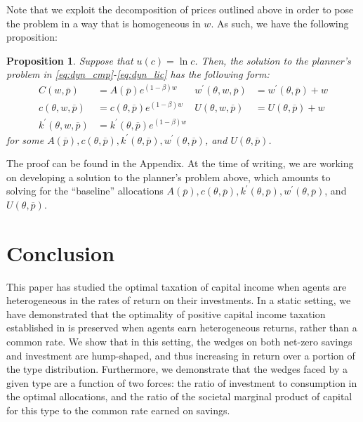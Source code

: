 \documentclass[11pt]{article}
\newtheorem{proposition}{Proposition}
\begin{document}
Note that we exploit the decomposition of prices outlined above in order to pose the problem in a way that is homogeneous in \( w \). As such, we have the following proposition: 
\begin{proposition} \label{prop:vf_homog}
    Suppose that \( u(c) = \ln c \). Then, the solution to the planner's problem in \eqref{eq:dyn_cmp}-\eqref{eq:dyn_lic} has the following form:
    \begin{align*}
        C\left(w,\overline{p}\right)&=A\left(\overline{p}\right)e^{\left(1-\beta\right)w}&w^{\prime}\left(\theta,w,\overline{p}\right)&=w^{\prime}\left(\theta,\overline{p}\right)+w\\c\left(\theta,w,\overline{p}\right)&=c\left(\theta,\overline{p}\right)e^{\left(1-\beta\right)w}&U\left(\theta,w,\overline{p}\right)&=U\left(\theta,\overline{p}\right)+w\\k^{\prime}\left(\theta,w,\overline{p}\right)&=k^{\prime}\left(\theta,\overline{p}\right)e^{\left(1-\beta\right)w}&&
    \end{align*}
    for some \( A\left( \overline{p} \right),c(\theta,\overline{p}),k^{\prime}(\theta,\overline{p}),w^{\prime}(\theta,\overline{p}) \), and \( U(\theta,\overline{p}) \).
\end{proposition}

The proof can be found in the Appendix. At the time of writing, we are working on developing a solution to the planner's problem above, which amounts to solving for the ``baseline'' allocations \( A\left( \overline{p} \right),c(\theta,\overline{p}),k^{\prime}(\theta,\overline{p}),w^{\prime}(\theta,\overline{p}) \), and \( U(\theta,\overline{p}) \).

\section{Conclusion} \label{sec:concl}

This paper has studied the optimal taxation of capital income when agents are heterogeneous in the rates of return on their investments. In a static setting, we have demonstrated that the optimality of positive capital income taxation established in \cite{golosov2003optimal} is preserved when agents earn heterogeneous returns, rather than a common rate. We show that in this setting, the wedges on both net-zero savings and investment are hump-shaped, and thus increasing in return over a portion of the type distribution. Furthermore, we demonstrate that the wedges faced by a given type are a function of two forces: the ratio of investment to consumption in the optimal allocations, and the ratio of the societal marginal product of capital for this type to the common rate earned on savings. 
\end{document}
